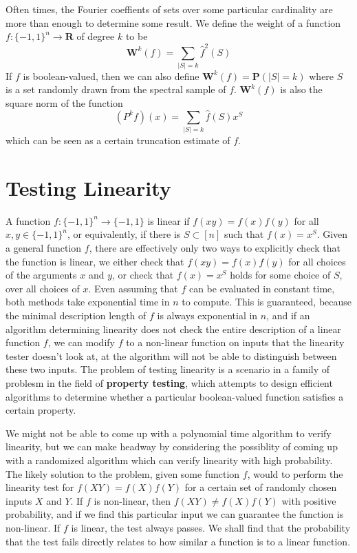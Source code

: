 Often times, the Fourier coeffients of sets over some particular cardinality are more than enough to determine some result. We define the weight of a function $f: \{ -1, 1 \}^n \to \mathbf{R}$ of degree $k$ to be
%
\[ \mathbf{W}^k(f) = \sum_{|S| = k} \widehat{f}^2(S) \]
%
If $f$ is boolean-valued, then we can also define $\mathbf{W}^k(f) = \mathbf{P}(|S| = k)$ where $S$ is a set randomly drawn from the spectral sample of $f$. $\mathbf{W}^k(f)$ is also the square norm of the function
%
\[ (P^kf)(x) = \sum_{|S| = k} \widehat{f}(S) x^S \]
%
which can be seen as a certain truncation estimate of $f$.

\section{Testing Linearity}

A function $f: \{ -1, 1 \}^n \to \{ -1, 1 \}$ is linear if $f(xy) = f(x) f(y)$ for all $x,y \in \{ -1, 1 \}^n$, or equivalently, if there is $S \subset [n]$ such that $f(x) = x^S$. Given a general function $f$, there are effectively only two ways to explicitly check that the function is linear, we either check that $f(xy) = f(x) f(y)$ for all choices of the arguments $x$ and $y$, or check that $f(x) = x^S$ holds for some choice of $S$, over all choices of $x$. Even assuming that $f$ can be evaluated in constant time, both methods take exponential time in $n$ to compute. This is guaranteed, because the minimal description length of $f$ is always exponential in $n$, and if an algorithm determining linearity does not check the entire description of a linear function $f$, we can modify $f$ to a non-linear function on inputs that the linearity tester doesn't look at, at the algorithm will not be able to distinguish between these two inputs. The problem of testing linearity is a scenario in a family of problesm in the field of {\bf property testing}, which attempts to design efficient algorithms to determine whether a particular boolean-valued function satisfies a certain property.

We might not be able to come up with a polynomial time algorithm to verify linearity, but we can make headway by considering the possiblity of coming up with a randomized algorithm which can verify linearity with high probability. The likely solution to the problem, given some function $f$, would to perform the linearity test for $f(XY) = f(X) f(Y)$ for a certain set of randomly chosen inputs $X$ and $Y$. If $f$ is non-linear, then $f(XY) \neq f(X) f(Y)$ with positive probability, and if we find this particular input we can guarantee the function is non-linear. If $f$ is linear, the test always passes. We shall find that the probability that the test fails directly relates to how similar a function is to a linear function.

